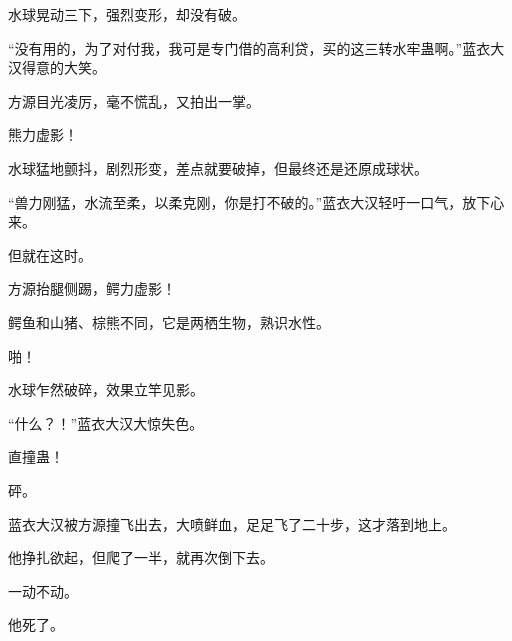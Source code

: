 \begin{this_body}
水球晃动三下，强烈变形，却没有破。

“没有用的，为了对付我，我可是专门借的高利贷，买的这三转水牢蛊啊。”蓝衣大汉得意的大笑。

方源目光凌厉，毫不慌乱，又拍出一掌。

熊力虚影！

水球猛地颤抖，剧烈形变，差点就要破掉，但最终还是还原成球状。

“兽力刚猛，水流至柔，以柔克刚，你是打不破的。”蓝衣大汉轻吁一口气，放下心来。

但就在这时。

方源抬腿侧踢，鳄力虚影！

鳄鱼和山猪、棕熊不同，它是两栖生物，熟识水性。

啪！

水球乍然破碎，效果立竿见影。

“什么？！”蓝衣大汉大惊失色。

直撞蛊！

砰。

蓝衣大汉被方源撞飞出去，大喷鲜血，足足飞了二十步，这才落到地上。

他挣扎欲起，但爬了一半，就再次倒下去。

一动不动。

他死了。

\end{this_body}

